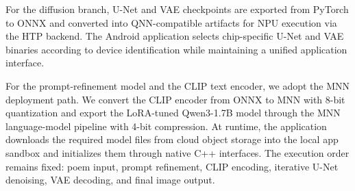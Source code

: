 For the diffusion branch, U-Net and VAE checkpoints are exported from PyTorch to ONNX and converted into QNN-compatible artifacts for NPU execution via the HTP backend. The Android application selects chip-specific U-Net and VAE binaries according to device identification while maintaining a unified application interface.

For the prompt-refinement model and the CLIP text encoder, we adopt the MNN deployment path. We convert the CLIP encoder from ONNX to MNN with 8-bit quantization and export the LoRA-tuned Qwen3-1.7B model through the MNN language-model pipeline with 4-bit compression. At runtime, the application downloads the required model files from cloud object storage into the local app sandbox and initializes them through native C++ interfaces. The execution order remains fixed: poem input, prompt refinement, CLIP encoding, iterative U-Net denoising, VAE decoding, and final image output.




